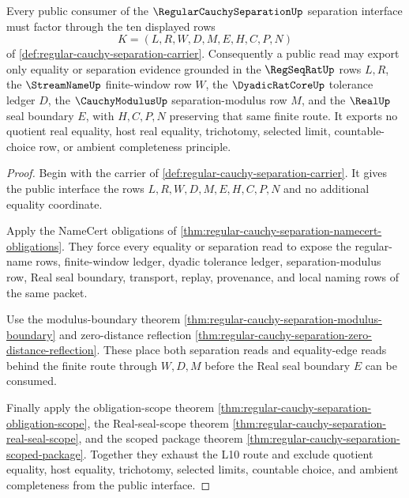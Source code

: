 \begin{theorem}
\label{thm:regular-cauchy-separation-public-interface}
Every public consumer of the $\RegularCauchySeparationUp$ separation interface must factor through the ten displayed rows
$$
K=(L,R,W,D,M,E,H,C,P,N)
$$
of \autoref{def:regular-cauchy-separation-carrier}. Consequently a public read may export only equality or separation evidence grounded in the $\RegSeqRatUp$ rows $L,R$, the $\StreamNameUp$ finite-window row $W$, the $\DyadicRatCoreUp$ tolerance ledger $D$, the $\CauchyModulusUp$ separation-modulus row $M$, and the $\RealUp$ seal boundary $E$, with $H,C,P,N$ preserving that same finite route. It exports no quotient real equality, host real equality, trichotomy, selected limit, countable-choice row, or ambient completeness principle.
\end{theorem}
\begin{proof}
Begin with the carrier of \autoref{def:regular-cauchy-separation-carrier}. It gives the public interface the rows $L,R,W,D,M,E,H,C,P,N$ and no additional equality coordinate.

Apply the NameCert obligations of \autoref{thm:regular-cauchy-separation-namecert-obligations}. They force every equality or separation read to expose the regular-name rows, finite-window ledger, dyadic tolerance ledger, separation-modulus row, Real seal boundary, transport, replay, provenance, and local naming rows of the same packet.

Use the modulus-boundary theorem \autoref{thm:regular-cauchy-separation-modulus-boundary} and zero-distance reflection \autoref{thm:regular-cauchy-separation-zero-distance-reflection}. These place both separation reads and equality-edge reads behind the finite route through $W,D,M$ before the Real seal boundary $E$ can be consumed.

Finally apply the obligation-scope theorem \autoref{thm:regular-cauchy-separation-obligation-scope}, the Real-seal-scope theorem \autoref{thm:regular-cauchy-separation-real-seal-scope}, and the scoped package theorem \autoref{thm:regular-cauchy-separation-scoped-package}. Together they exhaust the L10 route and exclude quotient equality, host equality, trichotomy, selected limits, countable choice, and ambient completeness from the public interface.
\end{proof}


